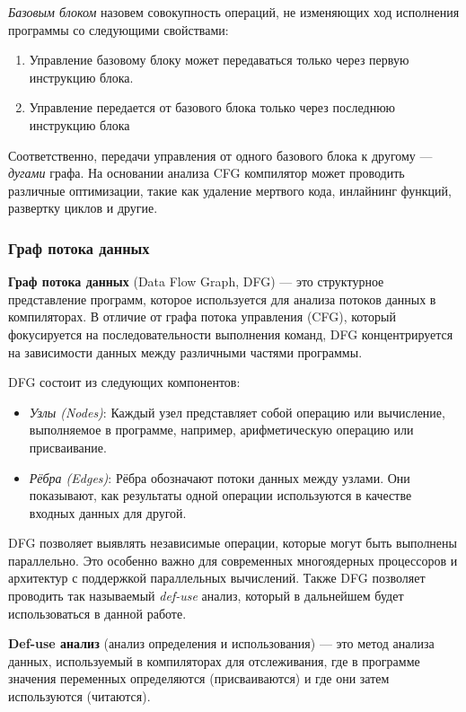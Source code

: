 \textit{Базовым блоком} назовем совокупность операций, не изменяющих ход исполнения программы со следующими свойствами:
\begin{enumerate}
    \item Управление базовому блоку может передаваться только через первую инструкцию блока.
    \item Управление передается от базового блока только через последнюю инструкцию блока
\end{enumerate}

Соответственно, передачи управления от одного базового блока к другому — \textit{дугами} графа. На основании анализа CFG компилятор может проводить различные оптимизации, такие как удаление мертвого кода, инлайнинг функций, развертку циклов и другие.

\subsubsection{Граф потока данных}

\textbf{Граф потока данных} (Data Flow Graph, DFG) — это структурное представление программ, которое используется для анализа потоков данных в компиляторах. В отличие от графа потока управления (CFG), который фокусируется на последовательности выполнения команд, DFG концентрируется на зависимости данных между различными частями программы.

DFG состоит из следующих компонентов:

\begin{itemize}
    \item \textit{Узлы (Nodes)}: Каждый узел представляет собой операцию или вычисление, выполняемое в программе, например, арифметическую операцию или присваивание.
    \item \textit{Рёбра (Edges)}: Рёбра обозначают потоки данных между узлами. Они показывают, как результаты одной операции используются в качестве входных данных для другой.
\end{itemize}

DFG позволяет выявлять независимые операции, которые могут быть выполнены параллельно. Это особенно важно для современных многоядерных процессоров и архитектур с поддержкой параллельных вычислений. Также DFG позволяет проводить так называемый \textit{def-use} анализ, который в дальнейшем будет использоваться в данной работе.

\textbf{Def-use анализ} (анализ определения и использования) — это метод анализа данных, используемый в компиляторах для отслеживания, где в программе значения переменных определяются (присваиваются) и где они затем используются (читаются).

